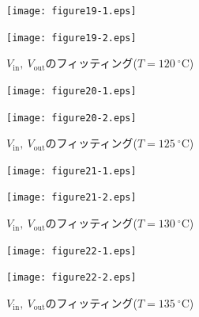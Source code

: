 \documentclass[a4paper,10.5pt]{ltjsarticle}
\begin{document}
\begin{figure}[b]
  \begin{minipage}[h]{0.50\linewidth}
    \centering
    \texttt{[image: figure19-1.eps]}
  \end{minipage}
  \begin{minipage}[h]{0.50\linewidth}
    \centering
    \texttt{[image: figure19-2.eps]}
  \end{minipage}
  \caption{$V_\mathrm{in},\ V_\mathrm{out}$のフィッティング($T=120\ ^\circ \mathrm{C}$)}
\end{figure}
\clearpage
\begin{figure}[b]
  \begin{minipage}[h]{0.50\linewidth}
    \centering
    \texttt{[image: figure20-1.eps]}
  \end{minipage}
  \begin{minipage}[h]{0.50\linewidth}
    \centering
    \texttt{[image: figure20-2.eps]}
  \end{minipage}
  \caption{$V_\mathrm{in},\ V_\mathrm{out}$のフィッティング($T=125\ ^\circ \mathrm{C}$)}
\end{figure}

\begin{figure}[b]
  \begin{minipage}[h]{0.50\linewidth}
    \centering
    \texttt{[image: figure21-1.eps]}
  \end{minipage}
  \begin{minipage}[h]{0.50\linewidth}
    \centering
    \texttt{[image: figure21-2.eps]}
  \end{minipage}
  \caption{$V_\mathrm{in},\ V_\mathrm{out}$のフィッティング($T=130\ ^\circ \mathrm{C}$)}
\end{figure}

\begin{figure}[b]
  \begin{minipage}[h]{0.50\linewidth}
    \centering
    \texttt{[image: figure22-1.eps]}
  \end{minipage}
  \begin{minipage}[h]{0.50\linewidth}
    \centering
    \texttt{[image: figure22-2.eps]}
  \end{minipage}
  \caption{$V_\mathrm{in},\ V_\mathrm{out}$のフィッティング($T=135\ ^\circ \mathrm{C}$)}
\end{figure}
\end{document}
